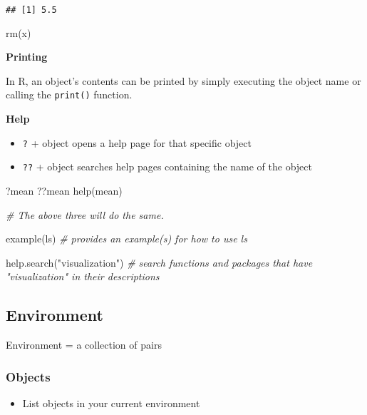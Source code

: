 \documentclass[
]{book}
\newenvironment{Shaded}{\begin{snugshade}}{\end{snugshade}}
\newcommand{\CommentTok}[1]{\textcolor[rgb]{0.56,0.35,0.01}{\textit{#1}}}
\newcommand{\FunctionTok}[1]{\textcolor[rgb]{0.00,0.00,0.00}{#1}}
\newcommand{\NormalTok}[1]{#1}
\newcommand{\StringTok}[1]{\textcolor[rgb]{0.31,0.60,0.02}{#1}}
\providecommand{\tightlist}{%
  \setlength{\itemsep}{0pt}\setlength{\parskip}{0pt}}
\begin{document}
\begin{verbatim}
## [1] 5.5
\end{verbatim}

\begin{Shaded}
\begin{Highlighting}[]
\FunctionTok{rm}\NormalTok{(x)}
\end{Highlighting}
\end{Shaded}

\textbf{Printing}

In R, an object's contents can be printed by simply executing the object name or calling the \texttt{print()} function.

\textbf{Help}

\begin{itemize}
\tightlist
\item
  \texttt{?} + object opens a help page for that specific object
\item
  \texttt{??} + object searches help pages containing the name of the object
\end{itemize}

\begin{Shaded}
\begin{Highlighting}[]
\NormalTok{?mean}
\NormalTok{??mean}
\FunctionTok{help}\NormalTok{(mean)}

\CommentTok{\# The above three will do the same. }

\FunctionTok{example}\NormalTok{(ls) }\CommentTok{\# provides an example(s) for how to use ls }

\FunctionTok{help.search}\NormalTok{(}\StringTok{"visualization"}\NormalTok{) }\CommentTok{\# search functions and packages that have "visualization" in their descriptions}
\end{Highlighting}
\end{Shaded}

\hypertarget{environment}{%
\subsection{Environment}\label{environment}}

Environment = a collection of pairs

\hypertarget{objects}{%
\subsubsection{Objects}\label{objects}}

\begin{itemize}
\tightlist
\item
  List objects in your current environment
\end{itemize}
\end{document}
